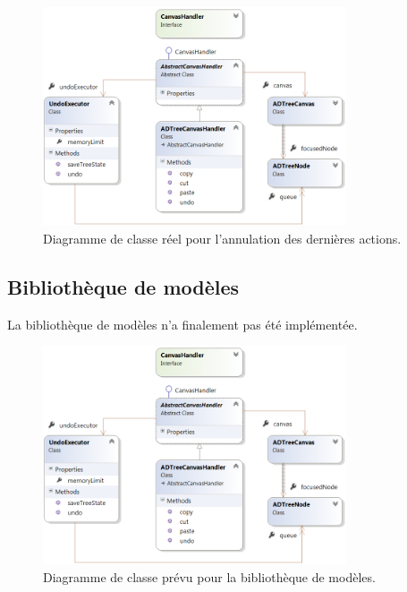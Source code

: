         \begin{figure}
            \centering
                \includegraphics[width=0.8\textwidth]{figure/ctrlzReel.png}
            \caption{Diagramme de classe réel pour l'annulation des dernières actions.}
            \label{fig:ctrlzReel}
        \end{figure}

	\subsection{Bibliothèque de modèles}
		La bibliothèque de modèles n'a finalement pas été implémentée.
		\begin{figure}
            \centering
                \includegraphics[width=0.8\textwidth]{figure/ctrlzReel.png}
            \caption{Diagramme de classe prévu pour la bibliothèque de modèles.}
            \label{fig:library}
        \end{figure}